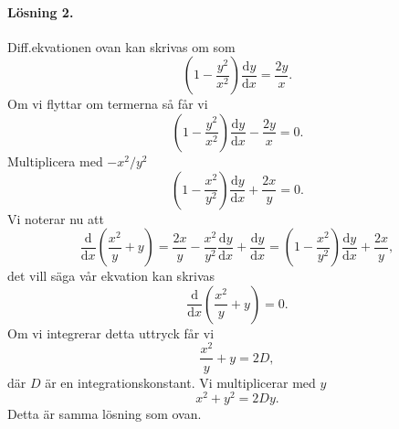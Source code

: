 \documentclass[%
oneside,                 %
final,                   %
10pt]{article}
\newenvironment{notice_mdfboxadmon}[1][]{
\begin{notice_mdfboxmdframed}[frametitle=#1]
}
{
\end{notice_mdfboxmdframed}
}
\begin{document}
\begin{notice_mdfboxadmon}
\paragraph{Lösning 2.}
Diff.ekvationen ovan kan skrivas om som
\begin{equation}
  \left(1 - \frac{y^2}{x^2}\right) \frac{\mbox{d}y}{\mbox{d}x} = \frac{2y}{x}.
\end{equation}
Om vi flyttar om termerna så får vi
\begin{equation}
  \left(1 - \frac{y^2}{x^2}\right) \frac{\mbox{d}y}{\mbox{d}x} - \frac{2y}{x} = 
0.
\end{equation}
Multiplicera med $-x^2/y^2$
\begin{equation}
  \left(1 - \frac{x^2}{y^2}\right) \frac{\mbox{d}y}{\mbox{d}x} + \frac{2x}{y}
= 0.
\end{equation}
Vi noterar nu att 
\begin{equation}
  \frac{\mbox{d}}{\mbox{d}x} \left(\frac{x^2}{y} + y\right) =
\frac{2x}{y} - \frac{x^2}{y^2} \frac{\mbox{d}y}{\mbox{d}x} + 
\frac{\mbox{d}y}{\mbox{d}x} = \left(1 - \frac{x^2}{y^2}\right) 
\frac{\mbox{d}y}{\mbox{d}x} + \frac{2x}{y},
\end{equation}
det vill säga vår ekvation kan skrivas
\begin{equation}
  \frac{\mbox{d}}{\mbox{d}x} \left(\frac{x^2}{y} + y\right) = 0.
\end{equation}
Om vi integrerar detta uttryck får vi
\begin{equation}
  \frac{x^2}{y} + y = 2D,
\end{equation}
där $D$ är en integrationskonstant.  Vi multiplicerar med $y$
\begin{equation}
  x^2 + y^2 = 2Dy.
\end{equation}
Detta är samma lösning som ovan.
\end{notice_mdfboxadmon} %




\end{document}
